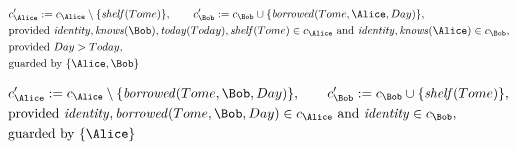 \begin{align*}
&
c'_
{
\Alice
}
 := 
c_
{
\Alice
}
 \setminus 
\{
\mathit{\detokenize{
shelf
}}
(
Tome
)
\}
, \qquad 
c'_
{
\Bob
}
 := 
c_
{
\Bob
}
 \cup 
\{
\mathit{\detokenize{
borrowed
}}
(
Tome
,
\Alice
,
Day
)
\}
,\\
&
\text{provided } 
\mathit{\detokenize{
identity
}}
,
\mathit{\detokenize{
knows
}}
(
\Bob
)
,
\mathit{\detokenize{
today
}}
(
Today
)
,
\mathit{\detokenize{
shelf
}}
(
Tome
)
 \in c_
{
\Alice
}
 \text{ and } 
\mathit{\detokenize{
identity
}}
,
\mathit{\detokenize{
knows
}}
(
\Alice
)
 \in c_
{
\Bob
}
,\\
&
\text{provided } 
Day
>
Today
,\\
&
\text{guarded by } \{
\Alice
,
\Bob
\}
\end{align*}

\begin{align*}
&
c'_
{
\Alice
}
 := 
c_
{
\Alice
}
 \setminus 
\{
\mathit{\detokenize{
borrowed
}}
(
Tome
,
\Bob
,
Day
)
\}
, \qquad 
c'_
{
\Bob
}
 := 
c_
{
\Bob
}
 \cup 
\{
\mathit{\detokenize{
shelf
}}
(
Tome
)
\}
,\\
&
\text{provided } 
\mathit{\detokenize{
identity
}}
,
\mathit{\detokenize{
borrowed
}}
(
Tome
,
\Bob
,
Day
)
 \in c_
{
\Alice
}
 \text{ and } 
\mathit{\detokenize{
identity
}}
 \in c_
{
\Bob
}
,\\
&
\text{guarded by } \{
\Alice
\}
\end{align*}
